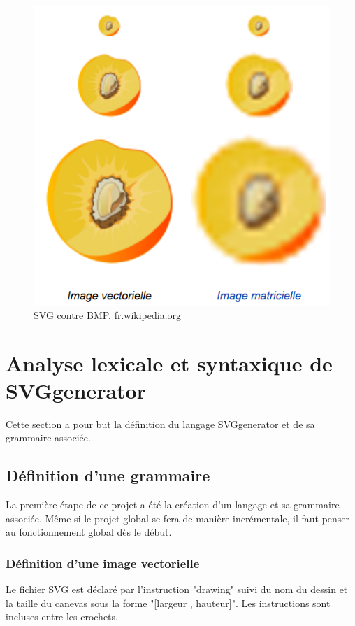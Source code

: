 \documentclass[11pt]{report} %
\begin{document}
\begin{figure}[h]
    \centering
    \includegraphics[scale=0.7]{img/SVG_vs_BMP.png}
    \caption{\label{CG} SVG contre BMP. \href{http://fr.wikipedia.org}{fr.wikipedia.org}}
\end{figure}

\chapter{Analyse lexicale et syntaxique de SVGgenerator}

Cette section a pour but la définition du langage SVGgenerator et de sa grammaire associée. 
\section{Définition d'une grammaire}
La première étape de ce projet a été la création d'un langage et sa grammaire associée. Même si le projet global se fera de manière incrémentale, il faut penser au fonctionnement global dès le début. 

\subsection{Définition d'une image vectorielle}

Le fichier SVG est déclaré par l'instruction "drawing" suivi du nom du dessin et la taille du canevas sous la forme "[largeur , hauteur]". Les instructions sont incluses entre les crochets.
\end{document}
